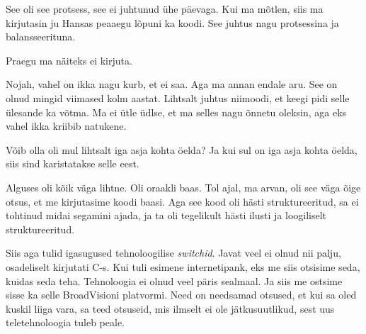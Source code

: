 See oli see protsess, see ei juhtunud ühe päevaga. Kui ma mõtlen, siis ma kirjutasin ju Hansas peaaegu lõpuni ka koodi. See juhtus nagu protsessina ja balansseerituna. 


Praegu ma näiteks ei kirjuta.


Nojah, vahel on ikka nagu kurb, et ei saa. Aga ma annan endale aru. See on olnud mingid viimased kolm aastat. Lihtsalt juhtus niimoodi, et keegi pidi selle ülesande ka võtma. Ma ei ütle üdlse, et ma selles nagu õnnetu oleksin, aga eks vahel ikka kriibib natukene.


Võib olla oli mul lihtsalt iga asja kohta öelda? Ja kui sul on iga asja kohta öelda, siis sind karistatakse selle eest. 


Alguses oli kõik väga lihtne. Oli oraakli baas. Tol ajal, ma arvan,  oli see väga õige otsus, et me kirjutasime koodi baasi. Aga see kood oli hästi struktureeritud, sa ei tohtinud midai segamini ajada, ja ta oli tegelikult hästi ilusti ja loogiliselt struktureeritud. 

Siis aga tulid igasugused tehnoloogilise \emph{switchid}. Javat veel  ei olnud nii palju, osadeliselt kirjutati C-s. Kui tuli esimene internetipank, eks me siis otsisime  seda, kuidas seda teha. Tehnoloogia ei olnud veel päris sealmaal. Ja siis me ostsime  sisse ka selle BroadVisioni platvormi. Need on needsamad otsused, et kui sa oled  kuskil liiga vara, sa teed  otsuseid, mis ilmselt ei ole  jätkusuutlikud, sest uus teletehnoloogia tuleb peale. 

